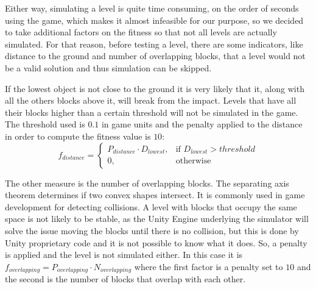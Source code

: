 \documentclass[runningheads,a4paper]{llncs}
\begin{document}
Either way, simulating a level is quite time consuming, on the order of
seconds using the game, which makes it almost infeasible for our purpose, so we
decided to take additional factors on the fitness so that not all
levels are actually simulated. 
For that reason, before testing a level, there are some indicators, like
distance to the ground and number of overlapping blocks, that a level would 
not be a valid solution
and thus simulation can be skipped.

If the lowest object is not close to the ground it is very likely that
it, along with all the others blocks above it, 
will break from the impact. Levels that have all their blocks higher than a 
certain threshold will not be simulated in the game. The threshold used is 
$0.1$ in game units and the penalty applied to the distance in order
to compute the fitness value is $10$:
$$f_{distance} = 
\begin{cases}
P_{distance}\cdot D_{lowest}, & \text{if } D_{lowest} > threshold\\
0, & \text{otherwise}
\end{cases}
$$



The other measure is the number of overlapping blocks. The separating axis 
theorem \cite{ericson2004real} determines if two convex shapes intersect. It is 
commonly used in game development for detecting collisions. A level with blocks 
that occupy the same space is not likely to be stable, as the Unity
Engine underlying the simulator will solve the issue moving the blocks until there
is no collision, but this is done by Unity proprietary code and it is not possible to know what it does.
So, a penalty is applied and the level is not simulated either. 
In this case it is $f_{overlapping} = P_{overlapping} \cdot N_{overlapping}$ 
where the first factor is a penalty set to $10$ and the second is the number of 
blocks that overlap with each other. 
\end{document}
